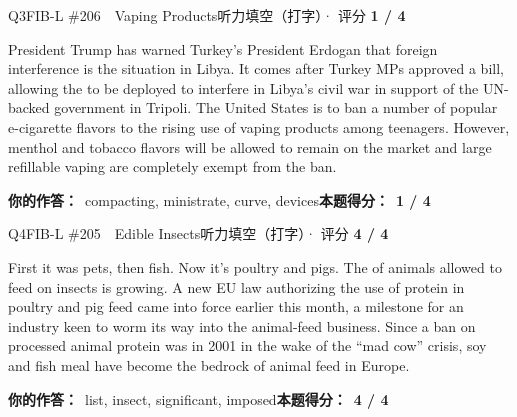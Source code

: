 \begin{qblock}{Q3\quad FIB-L \#206\ \ Vaping Products}{听力填空（打字）· 评分 \textcolor{cAccent}{\bfseries 1 / 4}}
\begin{promptbox}
President Trump has warned Turkey's President Erdogan that foreign interference is  the situation in Libya. It comes after Turkey MPs approved a bill, allowing the  to be deployed to interfere in Libya's civil war in support of the UN-backed government in Tripoli. The United States is to ban a number of popular e-cigarette flavors to  the rising use of vaping products among teenagers. However, menthol and tobacco flavors will be allowed to remain on the market and large refillable vaping  are completely exempt from the ban.
\end{promptbox}
\par\smallskip
\textbf{你的作答：}\ {\color{cWrong}compacting, ministrate, curve}, devices\qquad\textbf{本题得分：}\ {\color{cAccent}\bfseries 1 / 4}
\end{qblock}

\begin{qblock}{Q4\quad FIB-L \#205\ \ Edible Insects}{听力填空（打字）· 评分 \textcolor{cAccent}{\bfseries 4 / 4}}
\begin{promptbox}
First it was pets, then fish. Now it's poultry and pigs. The  of animals allowed to feed on insects is growing. A new EU law authorizing the use of  protein in poultry and pig feed came into force earlier this month, a  milestone for an industry keen to worm its way into the animal-feed business. Since a ban on processed animal protein was  in 2001 in the wake of the ``mad cow'' crisis, soy and fish meal have become the bedrock of animal feed in Europe.
\end{promptbox}
\par\smallskip
\textbf{你的作答：}\ list, insect, significant, imposed\qquad\textbf{本题得分：}\ {\color{cAccent}\bfseries 4 / 4}
\end{qblock}

